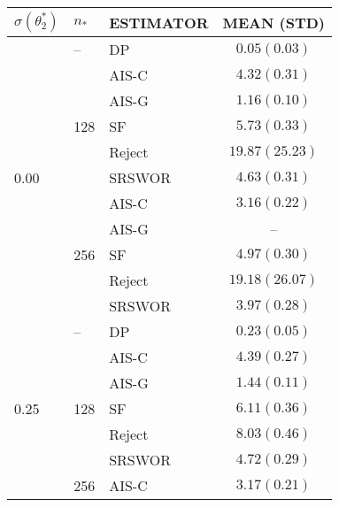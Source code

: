 \begin{tabular}{lllc}
  \toprule
  $\sigma(\theta^*_2)$   & $n_*$                & ESTIMATOR & MEAN (STD)              \\
  \midrule
  \multirow{11}{*}{0.00} & \multirow{1}{*}{--}  & DP        & $0.05(0.03)$            \\
  \cmidrule{2-4}
                         & \multirow{5}{*}{128} & AIS-C     & $4.32(0.31)$            \\
                         &                      & AIS-G     & $1.16(0.10)$            \\
                         &                      & SF        & $5.73(0.33)$            \\
                         &                      & Reject    & $19.87(25.23)$          \\
                         &                      & SRSWOR    & $4.63(0.31)$            \\
  \cmidrule{2-4}
                         & \multirow{5}{*}{256} & AIS-C     & $3.16(0.22)$            \\
                         &                      & AIS-G     & --                      \\
                         &                      & SF        & $4.97(0.30)$            \\
                         &                      & Reject    & $19.18(26.07)$          \\
                         &                      & SRSWOR    & $3.97(0.28)$            \\
  \midrule
  \multirow{11}{*}{0.25} & \multirow{1}{*}{--}  & DP        & $0.23(0.05)$            \\
  \cmidrule{2-4}
                         & \multirow{5}{*}{128} & AIS-C     & $4.39(0.27)$            \\
                         &                      & AIS-G     & $1.44(0.11)$            \\
                         &                      & SF        & $6.11(0.36)$            \\
                         &                      & Reject    & $8.03(0.46)$            \\
                         &                      & SRSWOR    & $4.72(0.29)$            \\
  \cmidrule{2-4}
                         & \multirow{5}{*}{256} & AIS-C     & $3.17(0.21)$            \\

\end{tabular}
